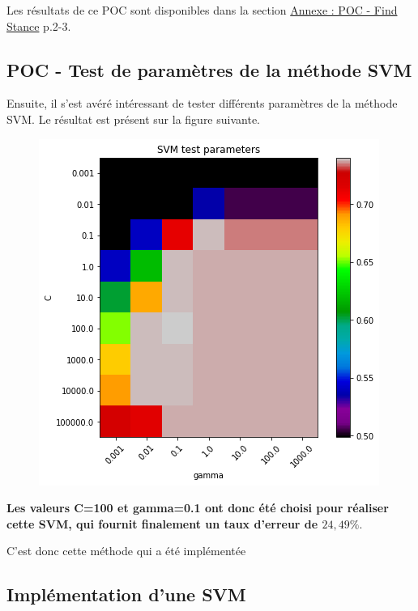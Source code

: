 Les résultats de ce POC sont disponibles dans la section \hyperref[annexe-stance-detection]{Annexe : POC - Find Stance} p.2-3.

\subsection{POC - Test de paramètres de la méthode SVM}

Ensuite, il s'est avéré intéressant de tester différents paramètres de la méthode SVM. Le résultat est présent sur la figure suivante.

\begin{figure}[!h]
\centering
\includegraphics{src/annexes/POC_FindStance_V2/output_24_0.png}
\end{figure}

\textbf{Les valeurs C=100 et gamma=0.1 ont donc été choisi pour réaliser cette SVM, qui fournit finalement un taux d'erreur de $24,49\%$}.

C'est donc cette méthode qui a été implémentée
\subsection{Implémentation d'une SVM}




